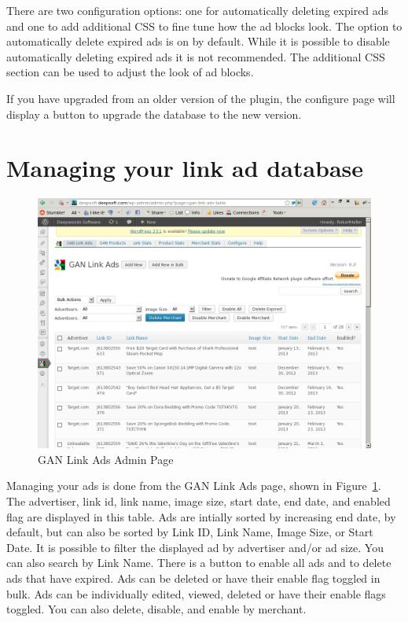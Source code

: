 \documentclass[letterpaper]{article}
\begin{document}
There are two configuration options: one for automatically deleting
expired ads and one to add additional CSS to fine tune how the ad
blocks look.  The option to automatically delete expired ads is on by
default. While it is possible to disable automatically deleting expired
ads it is not recommended.  The additional CSS section can be used to
adjust the look of ad blocks.

If you have upgraded from an older version of the plugin, the
configure page will display a button to upgrade the database to the new
version.

\section{Managing your link ad database}

\begin{figure}[ht] \begin{centering}
\includegraphics[width=4.5in]{ganlinkads.png} 
\caption{GAN Link Ads Admin Page} 
\label{fig:ganlinkads} 
\end{centering} 
\end{figure} 
Managing your ads is done from the GAN Link Ads page, shown in
Figure~\ref{fig:ganlinkads}. The advertiser, link id, link name, image size,
start date, end date, and enabled flag are displayed in this table. Ads
are intially sorted by increasing end date, by default, but can also be sorted
by  Link ID, Link Name, Image Size, or Start Date.  It is possible to
filter the displayed ad by advertiser and/or ad size.  You can also
search by Link Name. There is a button to enable all ads and to delete
ads that have expired.  Ads can be deleted or have their enable flag
toggled in bulk.  Ads can be individually edited, viewed, deleted or
have their enable flags toggled.  You can also delete, disable, and
enable by merchant.
\end{document}
